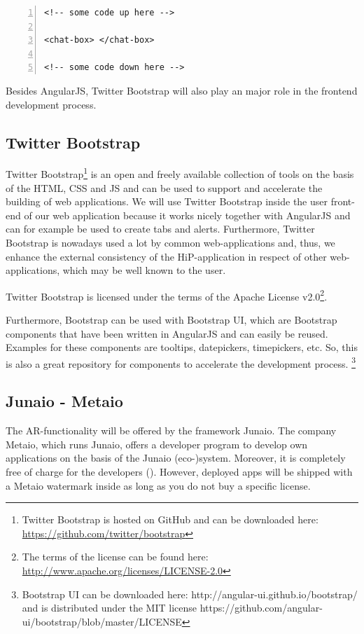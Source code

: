 \begin{lstlisting}[numbers=left,caption={Simple example that shows the usage of a custom directive},label=Angular:ownDirective,frame=tlbr,breaklines]
<!-- some code up here -->

<chat-box> </chat-box>

<!-- some code down here -->
\end{lstlisting}

Besides AngularJS, Twitter Bootstrap will also play an major role in the frontend development process.
 
\subsection{Twitter Bootstrap}
Twitter Bootstrap\footnote{Twitter Bootstrap is hosted on GitHub and can be downloaded here: \url{https://github.com/twitter/bootstrap}} is an open and freely available collection of tools on the basis of the \ac{HTML}, \ac{CSS} and \ac{JS} and can be used to support and accelerate the building of web applications. We will use Twitter Bootstrap inside the user front-end of our web application because it works nicely together with AngularJS and can for example be used to create tabs and alerts. Furthermore, Twitter Bootstrap is nowadays used a lot by common web-applications and, thus, we enhance the external consistency  of the \ac{HiP}-application in respect of other web-applications, which may be well known to the user. 

Twitter Bootstrap is licensed under the terms of the Apache License v2.0\footnote{The terms of the license can be found here: \url{http://www.apache.org/licenses/LICENSE-2.0}}.

Furthermore, Bootstrap can be used with Bootstrap UI, which are Bootstrap components that have been written in AngularJS and can easily be reused. Examples for these components are tooltips, datepickers, timepickers, etc. So, this is also a great repository for components to accelerate the development process. \footnote{Bootstrap UI can be downloaded here: http://angular-ui.github.io/bootstrap/ and is distributed under the MIT license https://github.com/angular-ui/bootstrap/blob/master/LICENSE}

\subsection{Junaio - Metaio}
The \ac{AR}-functionality will be offered by the framework Junaio. The company Metaio, which runs Junaio, offers a developer program to develop own applications on the basis of the Junaio (eco-)system. Moreover, it is completely free of charge for the developers (\cite{junaio1}). However, deployed apps will be shipped with a Metaio watermark inside as long as you do not buy a specific license. 


